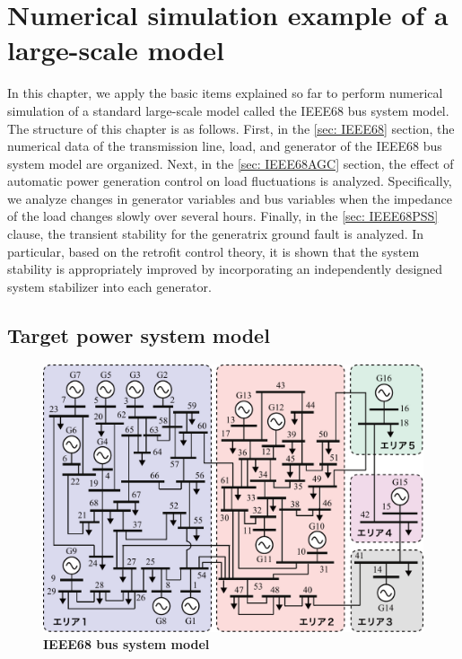 \documentclass[tombow,dvipdfmx]{corona-a5-1.1}
\begin{document}
\chapter{Numerical simulation example of a large-scale model}\label{chap:largesim}

In this chapter, we apply the basic items explained so far to perform numerical simulation of a standard large-scale model called the IEEE68 bus system model.
The structure of this chapter is as follows.
First, in the \ref{sec: IEEE68} section, the numerical data of the transmission line, load, and generator of the IEEE68 bus system model are organized.
Next, in the \ref{sec: IEEE68AGC} section, the effect of automatic power generation control on load fluctuations is analyzed.
Specifically, we analyze changes in generator variables and bus variables when the impedance of the load changes slowly over several hours.
Finally, in the \ref{sec: IEEE68PSS} clause, the transient stability for the generatrix ground fault is analyzed.
In particular, based on the retrofit control theory, it is shown that the system stability is appropriately improved by incorporating an independently designed system stabilizer into each generator.


\section{Target power system model}\label{sec:IEEE68}

\begin{figure}[t]
\centering
\includegraphics[width = .99\linewidth]{figs/IEEE68bus}
\medskip
\caption{\textbf{IEEE68 bus system model}}
\label{fig:IEEE68bus}
\medskip
\end{figure}
\end{document}
